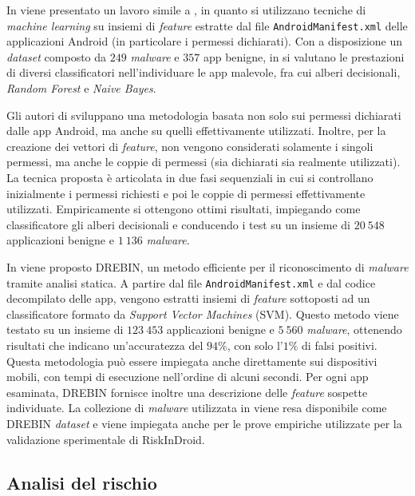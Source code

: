 \documentclass[12pt,a4paper,oneside]{article}
\begin{document}
In \cite{PUMA} viene presentato un lavoro simile a \cite{PERMISSION_FEATURES}, in quanto si utilizzano tecniche di \textit{machine learning} su insiemi di \textit{feature} estratte dal file \texttt{AndroidManifest.xml} delle applicazioni Android (in particolare i permessi dichiarati). Con a disposizione un \textit{dataset} composto da $249$ \textit{malware} e $357$ app benigne, in \cite{PUMA} si valutano le prestazioni di diversi classificatori nell'individuare le app malevole, fra cui alberi decisionali, \textit{Random Forest} e \textit{Naive Bayes}.
\newline

Gli autori di \cite{TWO_LAYER} sviluppano una metodologia basata non solo sui permessi dichiarati dalle app Android, ma anche su quelli effettivamente utilizzati. Inoltre, per la creazione dei vettori di \textit{feature}, non vengono considerati solamente i singoli permessi, ma anche le coppie di permessi (sia dichiarati sia realmente utilizzati). La tecnica proposta è articolata in due fasi sequenziali in cui si controllano inizialmente i permessi richiesti e poi le coppie di permessi effettivamente utilizzati. Empiricamente si ottengono ottimi risultati, impiegando come classificatore gli alberi decisionali e conducendo i test su un insieme di $20~548$ applicazioni benigne e $1~136$ \textit{malware}.
\newline

In \cite{DREBIN_DATASET} viene proposto DREBIN, un metodo efficiente per il riconoscimento di \textit{malware} tramite analisi statica. A partire dal file \texttt{AndroidManifest.xml} e dal codice decompilato delle app, vengono estratti insiemi di \textit{feature} sottoposti ad un classificatore formato da \textit{Support Vector Machines} (\acrshort{SVM}). Questo metodo viene testato su un insieme di $123~453$ applicazioni benigne e $5~560$ \textit{malware}, ottenendo risultati che indicano un'accuratezza del $94\%$, con solo l'$1\%$ di falsi positivi. Questa metodologia può essere impiegata anche direttamente sui dispositivi mobili, con tempi di esecuzione nell'ordine di alcuni secondi. Per ogni app esaminata, DREBIN fornisce inoltre una descrizione delle \textit{feature} sospette individuate. La collezione di \textit{malware} utilizzata in \cite{DREBIN_DATASET} viene resa disponibile come DREBIN \textit{dataset} e viene impiegata anche per le prove empiriche utilizzate per la validazione sperimentale di RiskInDroid.



\subsection{Analisi del rischio}\label{sec:risk_analysis}
\end{document}

